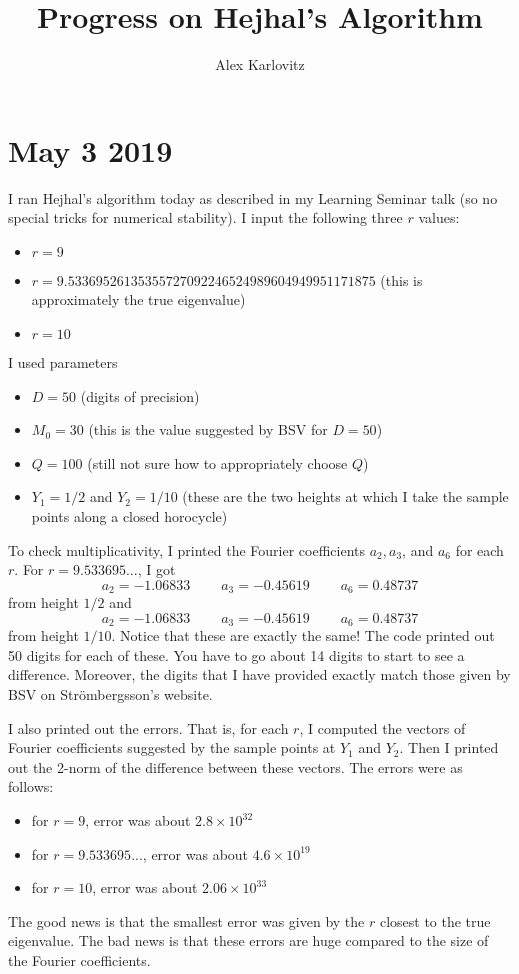 \documentclass[]{article}
\title{Progress on Hejhal's Algorithm}
\author{Alex Karlovitz}
\date{}
\begin{document}
	
	\maketitle
	
\section*{May 3 2019}

I ran Hejhal's algorithm today as described in my Learning Seminar talk (so no special tricks for numerical stability).
I input the following three $r$ values:
\begin{itemize}
	\item $r = 9$
	\item $r = 9.53369526135355727092246524989604949951171875$ (this is approximately the true eigenvalue)
	\item $r = 10$
\end{itemize}
I used parameters
\begin{itemize}
	\item $D = 50$ (digits of precision)
	\item $M_0 = 30$ (this is the value suggested by BSV for $D = 50$)
	\item $Q = 100$ (still not sure how to appropriately choose $Q$)
	\item $Y_1 = 1/2$ and $Y_2 = 1/10$ (these are the two heights at which I take the sample points along a closed horocycle)
\end{itemize}
To check multiplicativity, I printed the Fourier coefficients $a_2, a_3$, and $a_6$ for each $r$.
For $r = 9.533695...$, I got
$$
a_2 = -1.06833 ~~~~~~~~~~ a_3 = -0.45619 ~~~~~~~~~~ a_6 = 0.48737
$$
from height $1/2$ and
$$
a_2 = -1.06833 ~~~~~~~~~~ a_3 = -0.45619 ~~~~~~~~~~ a_6 = 0.48737
$$
from height $1/10$.
Notice that these are exactly the same! The code printed out 50 digits for each of these.
You have to go about 14 digits to start to see a difference.
Moreover, the digits that I have provided exactly match those given by BSV on Str\"ombergsson's website.

I also printed out the errors. That is, for each $r$, I computed the vectors of Fourier coefficients suggested by the sample points at $Y_1$ and $Y_2$.
Then I printed out the 2-norm of the difference between these vectors.
The errors were as follows:
\begin{itemize}
	\item for $r = 9$, error was about $2.8\times 10^{32}$
	\item for $r = 9.533695...$, error was about $4.6\times 10^{19}$
	\item for $r = 10$, error was about $2.06\times 10^{33}$
\end{itemize}
The good news is that the smallest error was given by the $r$ closest to the true eigenvalue.
The bad news is that these errors are huge compared to the size of the Fourier coefficients.
\end{document}
